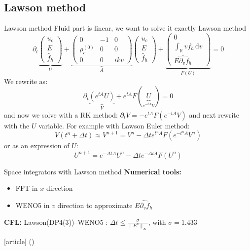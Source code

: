 \documentclass{beamer}
\newcommand{\cmark}{{\color{dgreen}\ding{52}}}
\newcommand{\arrow}{{\color{PLB}\ding{220}}}
\newcommand{\mbold}[1]{{\textbf{\color{PLB}#1}}}
\newcommand{\customcite}[1]{\citeauthor{#1} (\citeyear{#1})}
\begin{document}
\subsection{Lawson method}
\begin{frame}{Lawson method}
  Fluid part is linear, we want to solve it exactly \arrow Lawson method
  $$
    \partial_t \underbrace{\begin{pmatrix}
      u_c\\E\\\hat{f}_h
    \end{pmatrix}}_{U} + \underbrace{\begin{pmatrix}
      0 & -1 & 0 \\ \rho_c^{(0)} & 0 & 0 \\ 0 & 0 & ikv
    \end{pmatrix}}_{A} \begin{pmatrix}
      u_c\\E\\\hat{f}_h
    \end{pmatrix} + \underbrace{\begin{pmatrix}
      0\\\int_\mathbb{R}vf_h\,\mathrm{d}v \\\widehat{E\partial_vf_h}
    \end{pmatrix}}_{F(U)} = 0
  $$
  We rewrite as:
  $$
    \partial_t\underbrace{\left(e^{tA}U\right)}_{V} + e^{tA}F(\underbrace{U}_{e^{-tA}V}) = 0
  $$
  and now we solve with a RK method: $\partial_tV = -e^{tA}F(e^{-tA}V)$ and next rewrite with the $U$ variable. For example with Lawson Euler method:
  $$
    V(t^n+\Delta t) \approx V^{n+1} = V^n - \Delta t e^{t^nA}F(e^{-t^nA}V^n)
  $$
  or as an expression of $U$:
  $$
    U^{n+1} = e^{-\Delta t A}U^n - \Delta te^{-\Delta t A}F(U^n)
  $$
\end{frame}

\begin{frame}{Space integrators with Lawson method}
  \mbold{Numerical tools:}
  \begin{itemize}
    \item FFT in $x$ direction
    \item WENO5 in $v$ direction to approximate $\widehat{E\partial_vf_h}$
  \end{itemize}

  \mbold{CFL:} Lawson(DP4(3))--WENO5 : $\Delta t\leq\frac{\sigma}{\|E^n\|_\infty}$, with $\sigma=1.433$
  \begin{thebibliography}{9}
    [article]
     \customcite{Crouseilles:2019b}
  \end{thebibliography}
\end{frame}
\end{document}
